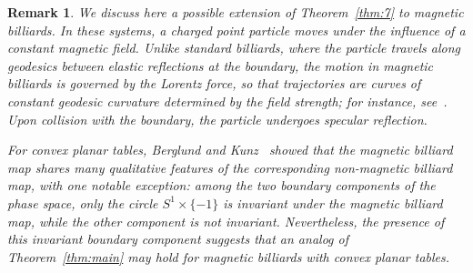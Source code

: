 \documentclass[a4paper,12pt,reqno]{amsart}
\numberwithin{equation}{section}
\newtheorem{remark}[theorem]{Remark}
\begin{document}


\begin{remark}
We discuss here a possible extension of Theorem~\ref{thm:7} to magnetic billiards. In these systems, a charged point particle moves under the influence of a constant magnetic field. Unlike standard billiards, where the particle travels along geodesics between elastic reflections at the boundary, the motion in magnetic billiards is governed by the Lorentz force, so that trajectories are curves of constant geodesic curvature determined by the field strength;  for instance, see~\cite{Berglund1996MagneticBilliards,Gutkin2001}. Upon collision with the boundary, the particle undergoes specular reflection.

For convex planar tables, Berglund and Kunz~\cite{Berglund1996MagneticBilliards} showed that the magnetic billiard map shares many qualitative features of the corresponding non-magnetic billiard map, with one notable exception: among the two boundary components of the phase space, only the circle $S^{1}\times\{-1\}$ is invariant under the magnetic billiard map, while the other component is not invariant. Nevertheless, the presence of this invariant boundary component suggests that an analog of Theorem~\ref{thm:main} may hold for magnetic billiards with convex planar tables.
\end{remark}
\end{document}
